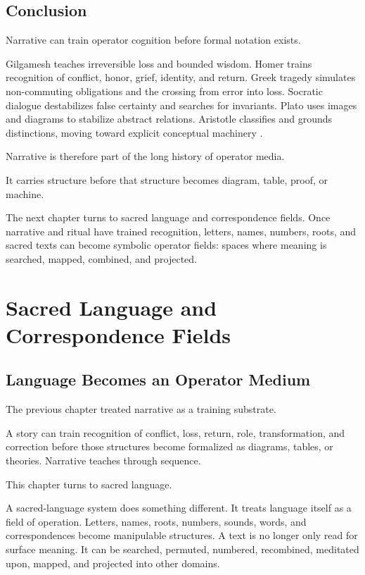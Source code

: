\documentclass[11pt]{book}
\begin{document}
\section{Conclusion}

Narrative can train operator cognition before formal notation exists.

Gilgamesh teaches irreversible loss and bounded wisdom. Homer trains recognition of conflict, honor, grief, identity, and return. Greek tragedy simulates non-commuting obligations and the crossing from error into loss. Socratic dialogue destabilizes false certainty and searches for invariants. Plato uses images and diagrams to stabilize abstract relations. Aristotle classifies and grounds distinctions, moving toward explicit conceptual machinery \cite{George2003Gilgamesh,HomerFagles1990Iliad,HomerFagles1996Odyssey,LefkowitzRomilly2016GreekTragedies,PlatoCooper1997CompleteWorks,AristotleBarnes1984CompleteWorks}.

Narrative is therefore part of the long history of operator media.

It carries structure before that structure becomes diagram, table, proof, or machine.

The next chapter turns to sacred language and correspondence fields. Once narrative and ritual have trained recognition, letters, names, numbers, roots, and sacred texts can become symbolic operator fields: spaces where meaning is searched, mapped, combined, and projected.

\chapter{Sacred Language and Correspondence Fields}

\section{Language Becomes an Operator Medium}

The previous chapter treated narrative as a training substrate.

A story can train recognition of conflict, loss, return, role, transformation, and correction before those structures become formalized as diagrams, tables, or theories. Narrative teaches through sequence.

This chapter turns to sacred language.

A sacred-language system does something different. It treats language itself as a field of operation. Letters, names, roots, numbers, sounds, words, and correspondences become manipulable structures. A text is no longer only read for surface meaning. It can be searched, permuted, numbered, recombined, meditated upon, mapped, and projected into other domains.
\end{document}
